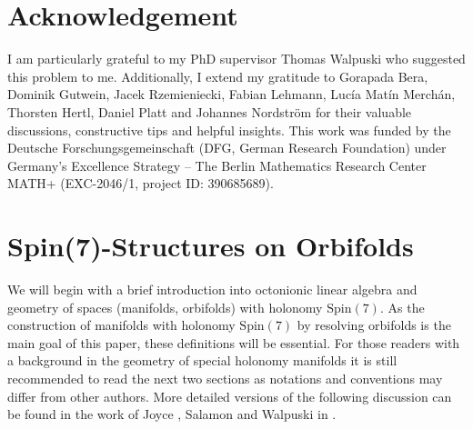 \documentclass[psamsfonts]{amsart}
\theoremstyle{plain}
\theoremstyle{definition}{
\newtheorem{defi}{Definition}[section]
\newtheorem{ass}{Assumption}
\newtheorem*{nota}{Notation}}
\theoremstyle{remark}{
\newtheorem{rem}{Remark}
\newtheorem{ex}{Example}}
\theoremstyle{plain}{
\newtheorem{thm}{Theorem}[section]
\newtheorem{lem}{Lemma}[section]
\newtheorem{cor}{Corollary}[section]
\newtheorem{prop}{Proposition}[section]
\newtheorem{con}{Conjecture}[section]}
\newcommand{\m}[1]{{\mathrm{#1}}}
\begin{document}

\section*{Acknowledgement}
I am particularly grateful to my PhD supervisor Thomas Walpuski who suggested this problem to me. Additionally, I extend my gratitude to Gorapada Bera, Dominik Gutwein,  Jacek Rzemieniecki, Fabian Lehmann, Luc\'ia Mat\'in Merch\'an, Thorsten Hertl, Daniel Platt and Johannes Nordström for their valuable discussions, constructive tips and helpful insights. This work was funded by the Deutsche Forschungsgemeinschaft (DFG, German Research Foundation) under Germany's Excellence Strategy – The Berlin Mathematics Research Center MATH+ (EXC-2046/1, project ID: 390685689).



\section{Spin(7)-Structures on Orbifolds}
\label{Spin7-Structures on Orbifolds}

We will begin with a brief introduction into octonionic linear algebra and geometry of spaces (manifolds, orbifolds) with holonomy $\m{Spin}(7)$. As the construction of manifolds with holonomy $\m{Spin}(7)$ by resolving orbifolds is the main goal of this paper, these definitions will be essential. For those readers with a background in the geometry of special holonomy manifolds it is still recommended to read the next two sections as notations and conventions may differ from other authors. More detailed versions of the following discussion can be found in the work of Joyce \cite[Sec. 10]{joyce2000compact}, Salamon and Walpuski in \cite[Sec. 5-7, Sec. 9]{salamon2010notes}.
\end{document}
